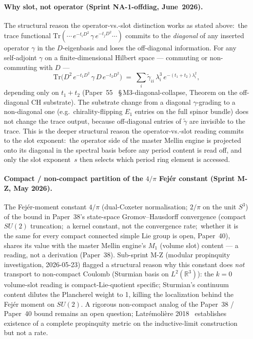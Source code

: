 \documentclass[aps,pra,twocolumn,superscriptaddress,longbibliography]{revtex4-2}
\begin{document}
\paragraph{Why slot, not operator (Sprint NA-1-offdiag, June~2026).}
The structural reason the operator-vs.-slot distinction works as
stated above:\ the trace functional
$\mathrm{Tr}(\cdots\, e^{-t_i D^2}\, \gamma\, e^{-t_j D^2}\cdots)$
commits to the \emph{diagonal} of any inserted operator $\gamma$ in
the $D$-eigenbasis and loses the off-diagonal information.  For any
self-adjoint $\gamma$ on a finite-dimensional Hilbert space ---
commuting or non-commuting with $D$ ---
\[
\mathrm{Tr}\big(D^2\, e^{-t_1 D^2}\, \gamma\, D\, e^{-t_2 D^2}\big)
\;=\; \sum_i \widetilde{\gamma}_{ii}\,
\lambda_i^3\, e^{-(t_1 + t_2)\lambda_i^2},
\]
depending only on $t_1 + t_2$ (Paper~55~\cite{loutey_paper55}
\S\,M3-diagonal-collapse, Theorem on the off-diagonal CH substrate).
The substrate change from a diagonal $\gamma$-grading to a
non-diagonal one (e.g.\ chirality-flipping $E_1$ entries on the full
spinor bundle) does not change the trace output, because off-diagonal
entries of $\widetilde\gamma$ are invisible to the trace.  This is
the deeper structural reason the operator-vs.-slot reading commits
to the slot exponent:\ the operator side of the master Mellin engine
is projected onto its diagonal in the spectral basis before any
period content is read off, and only the slot exponent~$s$ then
selects which period ring element is accessed.

\paragraph{Compact / non-compact partition of the $4/\pi$ Fej\'er
constant (Sprint M-Z, May 2026).}
The Fej\'er-moment constant $4/\pi$ (dual-Coxeter normalisation; $2/\pi$ on the
unit $S^3$) of the bound in Paper~38's state-space Gromov--Hausdorff
convergence (compact $SU(2)$ truncation;\ a kernel constant, not the
convergence rate;\ whether it is the same for every compact connected
simple Lie group is open, Paper~40), shares its value with the
master Mellin engine's $M_1$ (volume slot) content --- a reading, not a
derivation (Paper~38).  Sub-sprint M-Z (modular propinquity
investigation, 2026-05-23) flagged a structural reason why this constant
does \emph{not} transport to non-compact Coulomb (Sturmian basis on
$L^2(\mathbb{R}^3)$): the $k = 0$ volume-slot reading is compact-Lie-quotient
specific; Sturmian's continuum content dilutes the Plancherel weight
to 1, killing the localization behind the Fej\'er moment on $SU(2)$.
A rigorous non-compact analog of the Paper~38 / Paper~40 bound remains
an open question; Latr\'emoli\`ere
2018~\cite{latremoliere2018} establishes existence of a complete
propinquity metric on the inductive-limit construction but not a rate.
\end{document}
